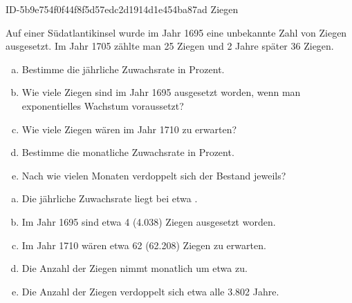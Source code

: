\begin{exercise}
      {ID-5b9e754f0f44f8f5d57edc2d1914d1e454ba87ad}
      {Ziegen}
  \ifproblem\problem\par
    Auf einer Südatlantikinsel wurde im Jahr 1695 eine
    unbekannte Zahl von Ziegen ausgesetzt. Im Jahr 1705
    zählte man 25 Ziegen und 2 Jahre später
    36 Ziegen.
    \begin{enumerate}[a)]
      \item Bestimme die jährliche Zuwachsrate in Prozent.
      \item Wie viele Ziegen sind im Jahr 1695 ausgesetzt
            worden, wenn man exponentielles Wachstum voraussetzt?
      \item Wie viele Ziegen wären im Jahr 1710 zu erwarten?
      \item Bestimme die monatliche Zuwachsrate in Prozent.
      \item Nach wie vielen Monaten verdoppelt sich der Bestand
            jeweils?
    \end{enumerate}
  \fi
  \ifoutcome\outcome\par
    \begin{enumerate}[a)]
      \item Die jährliche Zuwachsrate liegt bei etwa .
      \item Im Jahr 1695 sind etwa 4 (\num{4.038}) Ziegen
            ausgesetzt worden.
      \item Im Jahr 1710 wären etwa 62 (\num{62.208}) Ziegen
            zu erwarten.
      \item Die Anzahl der Ziegen nimmt monatlich um etwa
             zu.
      \item Die Anzahl der Ziegen verdoppelt sich etwa
            alle \num{3.802} Jahre.
    \end{enumerate}
  \fi
\end{exercise}
